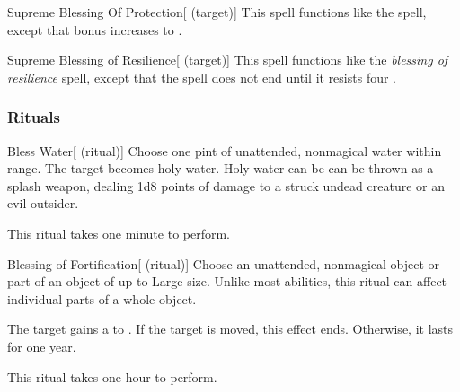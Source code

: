 \lowercase{\hypertarget{spell:Supreme Blessing Of Protection}{}}\label{spell:Supreme Blessing Of Protection}
\begin{attuneability}[\nth{7}]{\hypertarget{spell:Supreme Blessing Of Protection}{Supreme Blessing Of Protection}}[ (target)]
This spell functions like the  spell, except that bonus increases to .
\end{attuneability}
\vspace{0.25em}



\lowercase{\hypertarget{spell:Supreme Blessing of Resilience}{}}\label{spell:Supreme Blessing of Resilience}
\begin{attuneability}[\nth{7}]{\hypertarget{spell:Supreme Blessing of Resilience}{Supreme Blessing of Resilience}}[ (target)]
This spell functions like the \textit{blessing of resilience} spell, except that the spell does not end until it resists four .
\end{attuneability}
\vspace{0.25em}



\subsubsection{Rituals}


\lowercase{\hypertarget{spell:Bless Water}{}}\label{spell:Bless Water}
\begin{attuneability}[\nth{1}]{\hypertarget{spell:Bless Water}{Bless Water}}[ (ritual)]
Choose one pint of unattended, nonmagical water within \rngclose range.
The target becomes holy water.
Holy water can be can be thrown as a splash weapon, dealing 1d8 points of damage to a struck undead creature or an evil outsider.

This ritual takes one minute to perform.
\end{attuneability}
\vspace{0.25em}



\lowercase{\hypertarget{spell:Blessing of Fortification}{}}\label{spell:Blessing of Fortification}
\begin{attuneability}[\nth{1}]{\hypertarget{spell:Blessing of Fortification}{Blessing of Fortification}}[ (ritual)]
Choose an unattended, nonmagical object or part of an object of up to Large size.
Unlike most abilities, this ritual can affect individual parts of a whole object.

The target gains a   to .
If the target is moved, this effect ends.
Otherwise, it lasts for one year.

This ritual takes one hour to perform.
\end{attuneability}
\vspace{0.25em}



